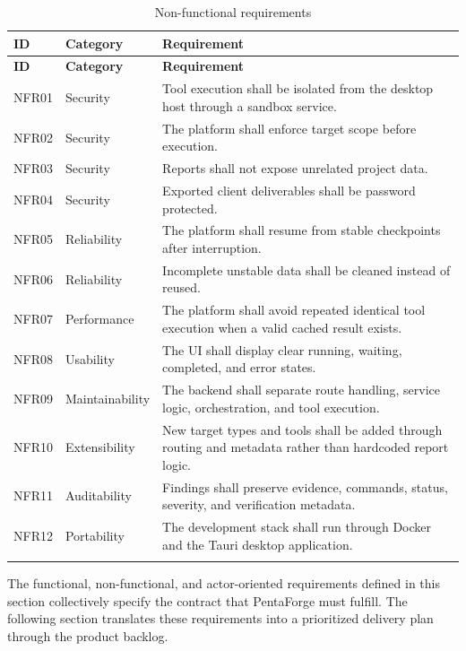 \documentclass[12pt,a4paper]{report}
\begin{document}
\begin{longtable}{|p{}|p{}|p{}|}
\hline
\textbf{ID} & \textbf{Category} & \textbf{Requirement} \\
\hline
\endfirsthead
\hline
\textbf{ID} & \textbf{Category} & \textbf{Requirement} \\
\hline
\endhead
NFR01 & Security & Tool execution shall be isolated from the desktop host
through a sandbox service. \\
\hline
NFR02 & Security & The platform shall enforce target scope before
execution. \\
\hline
NFR03 & Security & Reports shall not expose unrelated project data. \\
\hline
NFR04 & Security & Exported client deliverables shall be password
protected. \\
\hline
NFR05 & Reliability & The platform shall resume from stable checkpoints
after interruption. \\
\hline
NFR06 & Reliability & Incomplete unstable data shall be cleaned instead of
reused. \\
\hline
NFR07 & Performance & The platform shall avoid repeated identical tool
execution when a valid cached result exists. \\
\hline
NFR08 & Usability & The UI shall display clear running, waiting, completed,
and error states. \\
\hline
NFR09 & Maintainability & The backend shall separate route handling, service
logic, orchestration, and tool execution. \\
\hline
NFR10 & Extensibility & New target types and tools shall be added through
routing and metadata rather than hardcoded report logic. \\
\hline
NFR11 & Auditability & Findings shall preserve evidence, commands, status,
severity, and verification metadata. \\
\hline
NFR12 & Portability & The development stack shall run through Docker and the
Tauri desktop application. \\
\hline
\caption{Non-functional requirements}
\label{tab:nonfunctional_requirements}
\end{longtable}

The functional, non-functional, and actor-oriented requirements defined in this section collectively specify the contract that PentaForge must fulfill. The following section translates these requirements into a prioritized delivery plan through the product backlog.
\end{document}
